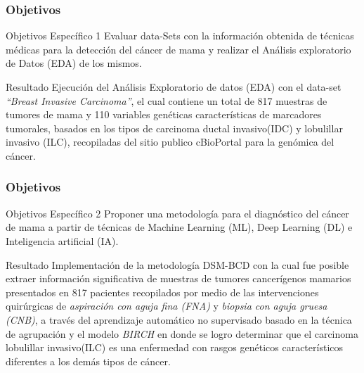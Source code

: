 \documentclass[xcolor=dvipsnames,xcolor=table,10pt]{beamer} %
\begin{document}
\begin{frame}
	\frametitle{Objetivos}
	\begin{block}{Objetivos Específico 1}\justifying
		Evaluar data-Sets con la información obtenida de técnicas médicas para la detección del cáncer de mama y realizar el Análisis exploratorio de Datos (EDA) de los mismos.		
	\end{block}
	
	\begin{exampleblock}{Resultado}
	\justifying	
	Ejecución del Análisis Exploratorio de datos (EDA) con el data-set \textit{“Breast Invasive Carcinoma”}, el cual contiene un total de 817 muestras de tumores de mama y 110 variables genéticas características de marcadores tumorales, basados en los tipos de carcinoma ductal invasivo(IDC) y lobulillar invasivo (ILC), recopiladas del sitio publico cBioPortal para la genómica del cáncer.
	\end{exampleblock}

\end{frame}

\begin{frame}
	\frametitle{Objetivos}
	\begin{block}{Objetivos Específico 2}\justifying
		Proponer una metodología para el diagnóstico del cáncer de mama a partir de técnicas de Machine Learning (ML), Deep Learning (DL) e Inteligencia artificial (IA).
	\end{block}
	
	\begin{exampleblock}{Resultado}
		\justifying	
		Implementación de la metodología DSM-BCD con la cual fue posible extraer información significativa de muestras de tumores cancerígenos mamarios presentados en 817 pacientes recopilados por medio de las intervenciones quirúrgicas de \textit{aspiración con aguja fina (FNA)} y \textit{biopsia con aguja gruesa (CNB)}, a través del aprendizaje automático no supervisado basado en la técnica de agrupación y el modelo \textit{BIRCH} en donde se logro determinar que el carcinoma lobulillar invasivo(ILC) es una enfermedad con rasgos genéticos característicos diferentes a los demás tipos de cáncer. 
	\end{exampleblock}
	
\end{frame}
\end{document}
